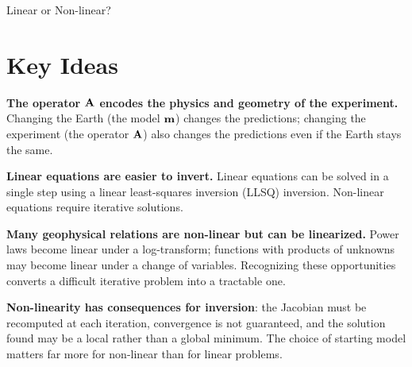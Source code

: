 \begin{activity}{Linear or Non-linear?}
\section*{Key Ideas}

\begin{minipage}[t]{0.58\textwidth}
\textbf{The operator $\vb{A}$ encodes the physics and geometry of the experiment.} Changing the Earth (the model $\vb{m}$) changes the predictions; changing the experiment (the operator $\vb{A}$) also changes the predictions even if the Earth stays the same.

\vspace{0.5em}
\textbf{Linear equations are easier to invert.} Linear equations can be solved in a single step using a linear least-squares inversion (LLSQ) inversion.  Non-linear equations require iterative solutions.

\vspace{0.5em}
\textbf{Many geophysical relations are non-linear but can be linearized.} Power laws become linear under a log-transform; functions with products of unknowns may become linear under a change of variables. Recognizing these opportunities converts a difficult iterative problem into a tractable one.

\vspace{0.5em}
\textbf{Non-linearity has consequences for inversion}: the Jacobian must be recomputed at each iteration, convergence is not guaranteed, and the solution found may be a local rather than a global minimum. The choice of starting model matters far more for non-linear than for linear problems.
\end{minipage}
\hfill
\begin{minipage}[t]{0.38\textwidth}
\end{minipage}
\end{activity}
